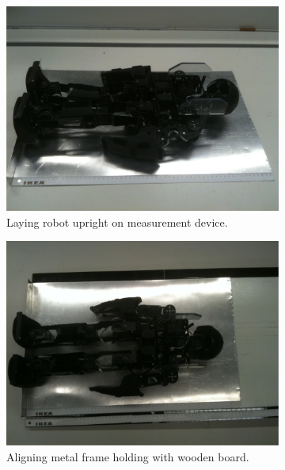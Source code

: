 \begin{figure}
  \begin{subfigure}{.45\textwidth}
    \centering
    \includegraphics[width=\textwidth]{img/com-measurement-step1}
    \caption{Laying robot upright on measurement device.}
    \label{fig:com-measurement-1}
  \end{subfigure}
  \hfill
  \begin{subfigure}{.45\textwidth}
    \centering
    \includegraphics[width=\textwidth]{img/com-measurement-step2}
    \caption{Aligning metal frame holding with wooden board.}
      \label{fig:com-measurement-2}
  \end{subfigure}
  \\
  \begin{subfigure}{.45\textwidth}

\end{subfigure}
\end{figure}

